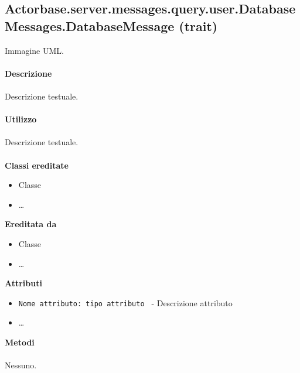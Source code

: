\documentclass[a4paper]{article}
\begin{document}
	\subsection{Actorbase.server.messages.query.user.DatabaseMessages.DatabaseMessage (trait)}
		Immagine UML.
		\\ \\
		\textbf{Descrizione}
			\\ \\
			Descrizione testuale.
			\\ \\
		\textbf{Utilizzo}
			\\ \\
			Descrizione testuale.
			\\ \\
		\textbf{Classi ereditate}
			\begin{itemize}
				\item Classe
				\item \dots
			\end{itemize}
		\textbf{Ereditata da}
			\begin{itemize}
				\item Classe
				\item \dots
			\end{itemize}
		\textbf{Attributi}
			\begin{itemize}
				\item \texttt{Nome attributo: tipo attributo } - Descrizione attributo
				\item \dots
			\end{itemize}
		\textbf{Metodi}
			\\ \\
			Nessuno.
			
\end{document}
